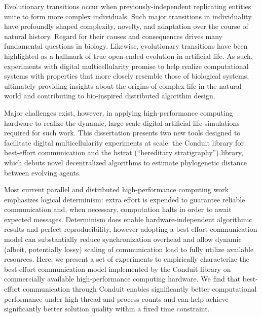 Evolutionary transitions occur when previously-independent replicating entities unite to form more complex individuals.
Such major transitions in individuality have profoundly shaped complexity, novelty, and adaptation over the course of natural history.
Regard for their causes and consequences drives many fundamental questions in biology.
Likewise, evolutionary transitions have been highlighted as a hallmark of true open-ended evolution in artificial life.
As such, experiments with digital multicellularity promise to help realize computational systems with properties that more closely resemble those of biological systems, ultimately providing insights about the origins of complex life in the natural world and contributing to bio-inspired distributed algorithm design.

Major challenges exist, however, in applying high-performance computing hardware to realize the dynamic, large-scale digital artificial life simulations required for such work.
This dissertation presents two new tools designed to facilitate digital multicellularity experiments at scale: the Conduit library for best-effort communication and the hstrat (``hereditary stratigraphy'') library, which debuts novel decentralized algorithms to estimate phylogenetic distance between evolving agents.

Most current parallel and distributed high-performance computing work emphasizes logical determinism: extra effort is expended to guarantee reliable communication and, when necessary, computation halts in order to await expected messages.
Determinism does enable hardware-independent algorithmic results and perfect reproducibility, however adopting a best-effort communication model can substantially reduce synchronization overhead and allow dynamic (albeit, potentially lossy) scaling of communication load to fully utilize available resources.
Here, we present a set of experiments to empirically characterize the best-effort communication model implemented by the Conduit library on commercially available high-performance computing hardware.
We find that best-effort communication through Conduit enables significantly better computational performance under high thread and process counts and can help achieve significantly better solution quality within a fixed time constraint.

